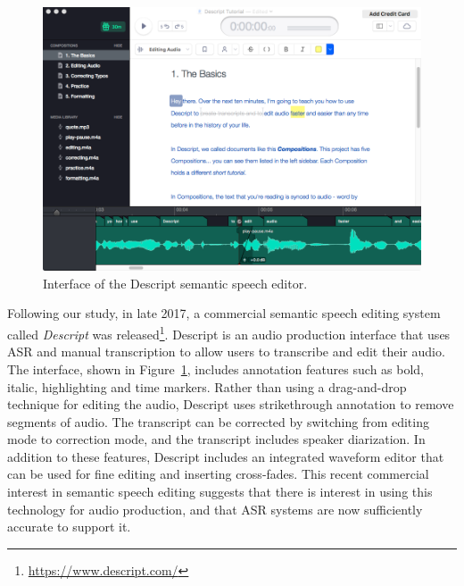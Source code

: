 \begin{figure}[ht]
\centering
  \includegraphics[width=.8\columnwidth]{figs/descript.png}
  \caption{Interface of the Descript semantic speech editor.}
  \label{fig:descript}
\end{figure}

Following our study, in late 2017, a commercial semantic speech editing system called \textit{Descript} was
released\footnote{\url{https://www.descript.com/}}. Descript is an audio production interface that uses ASR and manual
transcription to allow users to transcribe and edit their audio. The interface, shown in Figure~\ref{fig:descript},
includes annotation features such as bold, italic, highlighting and time markers.  Rather than using a drag-and-drop
technique for editing the audio, Descript uses strikethrough annotation to remove segments of audio. The transcript can
be corrected by switching from editing mode to correction mode, and the transcript includes speaker diarization.  In
addition to these features, Descript includes an integrated waveform editor that can be used for fine editing and
inserting cross-fades.  This recent commercial interest in semantic speech editing suggests that there is interest in
using this technology for audio production, and that ASR systems are now sufficiently accurate to support it.




